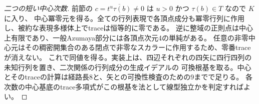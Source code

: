 \begin{proof}[二つの短い中心次数]
前節の $c=\overline{t^u\tau(b)}\ne0$ は $u>0$ かつ $\tau(b)\in T$ なので $K$ に入り、
中心冪零元を得る。全ての行列表現で各頂点成分も冪零行列に作用し、被約な表現多様体上でtraceは恒等的に零である。
逆に整域の正則点は中心上有限であり、一般Azumaya部分には各頂点次元4の単純がある。
任意の非零中心元はその稠密開集合のある閉点で非零なスカラーに作用するため、零番traceが消えない。
これで同値を得る。実装上は、四辺それぞれの四矢に四行四列の未知行列を置き、二次関係の行列成分の生成イデアルの
可換根基を取る。中心とそのtraceの計算は経路長8と、矢との可換性検査のための9までで足りる。
各次数の中心基底のtrace多項式がこの根基を法として線型独立かを判定すればよい。
\end{proof}

